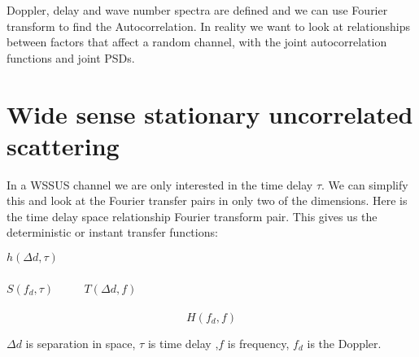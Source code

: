 Doppler, delay and wave number spectra are defined and we can use Fourier transform to find the Autocorrelation. In reality we want to look at relationships between factors that affect a random channel, with the joint autocorrelation functions and joint PSDs\citep{SpaceWirelessChan}.




\section{Wide sense stationary uncorrelated scattering}

In a \gls{WSSUS} channel we are only interested in the time delay $\tau$. We can simplify this and look at the Fourier transfer pairs in only two of the dimensions. Here is the time delay space relationship Fourier transform pair. This gives us the deterministic or instant transfer functions:

\begin{center}
$h(\Delta d,\tau)$\\
\\
$S(f_d,\tau)$ $\quad \quad$ $T(\Delta d,f)$\\
\\
\vspace{-1.9em}
\begin{equation}
H(f_d,f)
\end{equation}
\end{center}


$\Delta d$ is separation in space, $\tau$ is time delay ,$f$ is frequency, $f_d$ is the Doppler.

